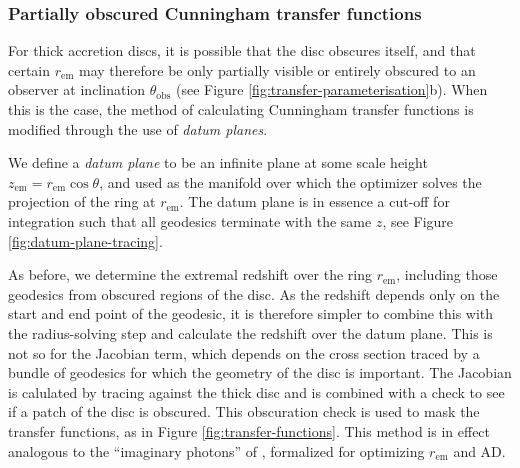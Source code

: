 \documentclass[fleqn,usenatbib]{mnras}
\begin{document}
\subsubsection{Partially obscured Cunningham transfer functions}
\label{sec:partially-obscured-functions}

For thick accretion discs, it is possible that the disc obscures itself, and
that certain $r_\text{em}$ may therefore be only partially visible or entirely
obscured to an observer at inclination $\theta_\text{obs}$ (see Figure
\ref{fig:transfer-parameterisation}b). When this is the case, the method of
calculating Cunningham transfer functions is modified through the use of
\emph{datum planes}.

We define a \emph{datum plane} to be an infinite plane at some scale height
$z_\text{em} = r_\text{em} \cos \theta$, and used as the manifold over which the
optimizer solves the projection of the ring at $r_\text{em}$. The datum plane
is in essence a cut-off for integration such that all geodesics terminate with
the same $z$, see Figure \ref{fig:datum-plane-tracing}.

As before, we determine the extremal redshift over the ring $r_\text{em}$,
including those geodesics from obscured regions of the disc. As the redshift
depends only on the start and end point of the geodesic, it is therefore simpler
to combine this with the radius-solving step and calculate the redshift over the
datum plane. This is not so for the Jacobian term, which depends on the cross
section traced by a bundle of geodesics for which the geometry of the disc is
important. The Jacobian is calulated by tracing against the thick disc and is
combined with a check to see if a patch of the disc is obscured. This
obscuration check is used to mask the transfer functions, as in Figure
\ref{fig:transfer-functions}. This method is in effect analogous to the
``imaginary photons'' of \cite{abdikamalov_testing_2020}, formalized for
optimizing $r_\text{em}$ and AD.
\end{document}
